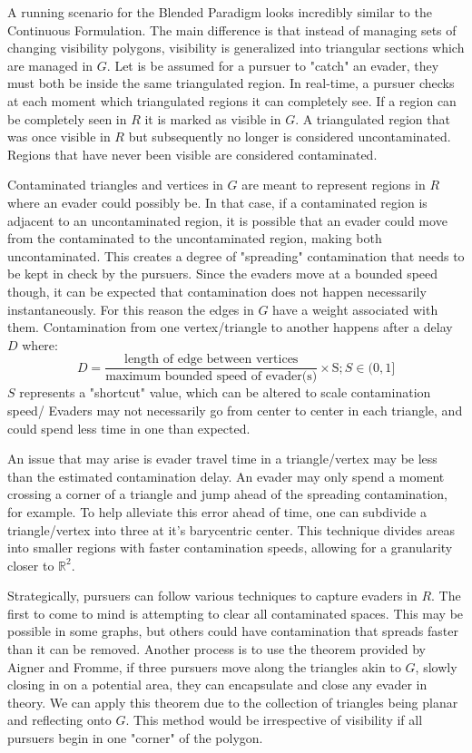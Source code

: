 \documentclass{article}
\begin{document}

A running scenario for the Blended Paradigm looks incredibly similar to the Continuous Formulation. The main difference is that instead of managing sets of changing visibility polygons, visibility is generalized into triangular sections which are managed in \(G\). Let is be assumed for a pursuer to "catch" an evader, they must both be inside the same triangulated region. In real-time, a pursuer checks at each moment which triangulated regions it can completely see. If a region can be completely seen in \(R\) it is marked as visible in \(G\). A triangulated region that was once visible in \(R\) but subsequently no longer is considered uncontaminated. Regions that have never been visible are considered contaminated. 

Contaminated triangles and vertices in \(G\) are meant to represent regions in \(R\) where an evader could possibly be. In that case, if a contaminated region is adjacent to an uncontaminated region, it is possible that an evader could move from the contaminated to the uncontaminated region, making both uncontaminated. This creates a degree of "spreading" contamination that needs to be kept in check by the pursuers. Since the evaders move at a bounded speed though, it can be expected that contamination does not happen necessarily instantaneously. For this reason the edges in \(G\) have a weight associated with them. Contamination from one vertex/triangle to another happens after a delay \(D\) where: \begin{displaymath}
D = \frac{\text{length of edge between vertices}}{\text{maximum bounded speed of evader(s)}}\times \text{S} ; S\in(0,1]
\end{displaymath}\(S\) represents a "shortcut" value, which can be altered to scale contamination speed/ Evaders may not necessarily go from center to center in each triangle, and could spend less time in one than expected.

An issue that may arise is evader travel time in a triangle/vertex may be less than the estimated contamination delay. An evader may only spend a moment crossing a corner of a triangle and jump ahead of the spreading contamination, for example. To help alleviate this error ahead of time, one can subdivide a triangle/vertex into three at it's barycentric center. This technique divides areas into smaller regions with faster contamination speeds, allowing for a granularity closer to \(\mathbb{R}^2\).

Strategically, pursuers can follow various techniques to capture evaders in \(R\). The first to come to mind is attempting to clear all contaminated spaces. This may be possible in some graphs, but others could have contamination that spreads faster than it can be removed. Another process is to use the theorem provided by Aigner and Fromme, if three pursuers move along the triangles akin to \(G\), slowly closing in on a potential area, they can encapsulate and close any evader in theory. We can apply this theorem due to the collection of triangles being planar and reflecting onto \(G\). This method would be irrespective of visibility if all pursuers begin in one "corner" of the polygon. 
\end{document}
